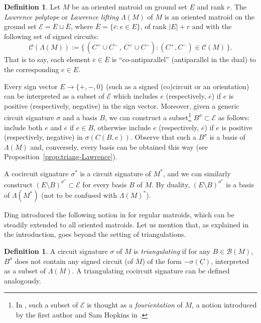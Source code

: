 \documentclass[12pt]{amsart}
\numberwithin{equation}{section}
\theoremstyle{definition}
\newtheorem{definition}[theorem]{Definition}
\newcommand{\Bcal}{{\mathcal B}}
\newcommand{\Ccal}{{\mathcal C}}
\newcommand{\Ecal}{{\mathcal E}}
\newcommand{\paco}[1]{\todo[color=orange!30]{\footnotesize \rm #1 \\ \hfill --- P.}}
\begin{document}
\begin{definition}
Let $M$ be an oriented matroid on ground set $E$ and rank $r$.
The {\em Lawrence polytope} or {\em Lawrence lifting} $\Lambda(M)$ of $M$ is an oriented matroid on the ground set $\Ecal=E\sqcup \overline{E}$, where $\overline{E}=\{\overline{e}:e\in E\}$, of rank $|E|+r$ and with the following set of signed circuits:
\[
\Ccal(\Lambda(M)):=
\{\,(C^+\cup\overline{C^-}\, ,\, \overline{C^+}\cup C^-) :
(C^+,C^-) \in \Ccal(M)\,\}.
\]
That is to say, each element $\overline e \in \overline{E}$ is 
``co-antiparallel'' (antiparallel in the dual) to the corresponding $e\in E$.
\end{definition}

Every sign vector $E\rightarrow\{+,-,0\}$ (such as a signed (co)circuit or an orientation) can be interpreted as a subset of $\Ecal$ which includes $e$ (respectively, $\overline{e}$) if $e$ is positive (respectively, negative) in the sign vector.
Moreover, given a generic circuit signature $\sigma$ and a basis $B$, we can construct a subset\footnote{In \cite{Ding_GB}, such a subset of $\Ecal$ is thought as a {\em fourientation} of $M$, a notion introduced by the first author and Sam Hopkins in \cite{BH_Four}.} $B^\sigma\subset\Ecal$ as follows: include both $e$ and $\overline{e}$ if $e\in B$, otherwise include $e$ (respectively, $\overline{e}$) if $e$ is positive (respectively, negative) in $\sigma(C(B,e))$.
Observe that such a $B^\sigma$ is a basis of $\Lambda(M)$ and, conversely, every basis can be obtained this way (see Proposition~\ref{prop:triang-Lawrence}).

A cocircuit signature $\sigma^*$ is a circuit signature of $M^*$, and we can similarly construct $(E\setminus B)^{\sigma^*}\subset\Ecal$ for every basis $B$ of $M$.
By duality, $(E\setminus B)^{\sigma^*}$ is a basis of $\Lambda(M^*)$ (not to be confused with $\Lambda(M)^*$).

Ding introduced the following notion in \cite{Ding_GB2} for regular matroids, which can be steadily extended to all oriented matroids.
Let us mention that, as explained in the introduction, \cite{Ding_GB2} goes beyond the setting of triangulations.


\begin{definition} 
A circuit signature $\sigma$ of $M$ is {\em triangulating} if for any $B\in\Bcal(M)$, $B^\sigma$ does not contain any signed circuit (of $M$) of the form $-\sigma(\underline{C})$, interpreted as a subset of $\Lambda(M)$.
A triangulating cocircuit signature can be defined analogously.
\end{definition}
\end{document}
